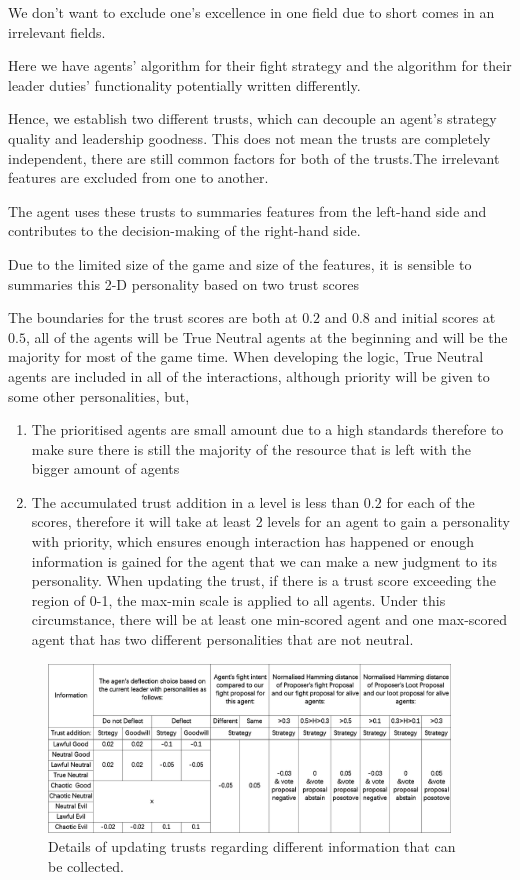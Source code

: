We don't want to exclude one's excellence in one field due to short comes in an irrelevant fields.

Here we have agents' algorithm for their fight strategy and the algorithm for their leader duties' functionality potentially written differently.

Hence, we establish two different trusts, which can decouple an agent's strategy quality and leadership goodness. This does not mean the trusts are completely independent, there are still common factors for both of the trusts.The irrelevant features are excluded from one to another.

The agent uses these trusts to summaries features from the left-hand side and contributes to the decision-making of the right-hand side.

Due to the limited size of the game and size of the features, it is sensible to summaries this 2-D personality based on two trust scores

The boundaries for the trust scores are both at $0.2$ and $0.8$ and initial scores at $0.5$, all of the agents will be True Neutral agents at the beginning and will be the majority for most of the game time. When developing the logic, True Neutral agents are included in all of the interactions, although priority will be given to some other personalities, but,
\begin{enumerate}
    \item The prioritised agents are small amount due to a high standards therefore to make sure there is still the majority of the resource that is left with the bigger amount of agents
    \item The accumulated trust addition in a level is less than $0.2$ for each of the scores, therefore it will take at least 2 levels for an agent to gain a personality with priority, which ensures enough interaction has happened or enough information is gained for the agent that we can make a new judgment to its personality. When updating the trust, if there is a trust score exceeding the region of 0-1, the max-min scale is applied to all agents. Under this circumstance, there will be at least one min-scored agent and one max-scored agent that has two different personalities that are not neutral.
\end{enumerate}

\begin{figure}[htb]
    \centering
    \includegraphics[width=0.95\textwidth]{008_team_5_agent_design/images/Information2Trusts-sideway.png}
    \caption{Details of updating trusts regarding different information that can be collected.}
    \label{fig:Information2Trusts}
\end{figure}

